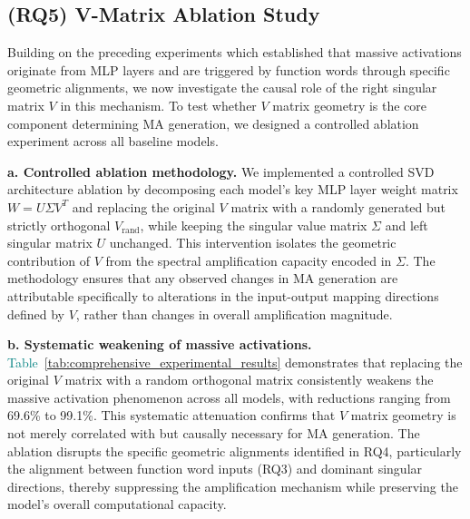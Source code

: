 \documentclass[conference]{IEEEtran}
\begin{document}
\vspace{0.5em}
\noindent{}
\vspace{0.5em}

\subsection{(RQ5) V-Matrix Ablation Study}
\label{sec:RQ5}

Building on the preceding experiments which established that massive activations originate from MLP layers and are triggered by function words through specific geometric alignments, we now investigate the causal role of the right singular matrix $V$ in this mechanism. To test whether $V$ matrix geometry is the core component determining MA generation, we designed a controlled ablation experiment across all baseline models.


\smallskip
\noindent\textbf{a. Controlled ablation methodology.}
We implemented a controlled SVD architecture ablation by decomposing each model's key MLP layer weight matrix $W = U\Sigma V^T$ and replacing the original $V$ matrix with a randomly generated but strictly orthogonal $V_{\text{rand}}$, while keeping the singular value matrix $\Sigma$ and left singular matrix $U$ unchanged. This intervention isolates the geometric contribution of $V$ from the spectral amplification capacity encoded in $\Sigma$. The methodology ensures that any observed changes in MA generation are attributable specifically to alterations in the input-output mapping directions defined by $V$, rather than changes in overall amplification magnitude.

\smallskip
\noindent\textbf{b. Systematic weakening of massive activations.}
\textcolor{teal}{Table~\ref{tab:comprehensive_experimental_results}} demonstrates that replacing the original $V$ matrix with a random orthogonal matrix consistently weakens the massive activation phenomenon across all models, with reductions ranging from 69.6\% to 99.1\%. This systematic attenuation confirms that $V$ matrix geometry is not merely correlated with but causally necessary for MA generation. The ablation disrupts the specific geometric alignments identified in RQ4, particularly the alignment between function word inputs (RQ3) and dominant singular directions, thereby suppressing the amplification mechanism while preserving the model's overall computational capacity.
\end{document}
